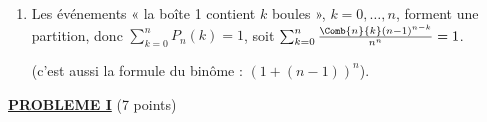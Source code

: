 \begin{description}
\begin{enumerate}
\begin{enumerate}
				\[
					P_n(k) = \frac{\Comb{n}{k}(n-1)^{n-k}}{n^n} = \Comb{n}{k}\left(\frac{1}{n}\right)^k \left(\frac{n-1}{n}\right)^{n-k} .
				\]
				\par\noindent{}
				(loi binomiale : chaque boule tombe dans la boîte 1 avec la probabilité $\frac{1}{n}$).
			\item {}
				Les événements « la boîte 1 contient $k$ boules », $k = 0, \ldots, n$, forment une partition, donc $\sum_{k=0}^{n} P_n(k) = 1$, soit
				$\sum_{k=0}^{n} \frac{\Comb{n}{k}(n-1)^{n-k}}{n^n} = 1$.
				\par\noindent{}
				(c'est aussi la formule du binôme : $(1 + (n-1))^n$).
		\end{enumerate}
	\end{enumerate}
\end{description}
\noindent \underline{\textsc{\textbf{PROBLEME I}}} (7 points)
